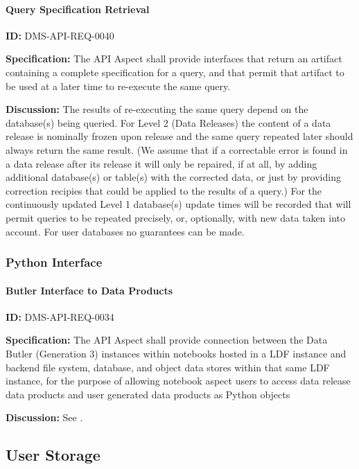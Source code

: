\documentclass[SE,toc]{lsstdoc}
\begin{document}
\paragraph{Query Specification Retrieval}\hfill  %

\label{DMS-API-REQ-0040}
\textbf{ID:} DMS-API-REQ-0040

\textbf{Specification:}
The API Aspect shall provide interfaces that return an artifact containing a complete specification for a query, and that permit that artifact to be used at a later time to re-execute the same query.

\textbf{Discussion:}
The results of re-executing the same query depend on the database(s) being queried.  For Level 2 (Data Releases) the content of a data release is nominally frozen upon release and the same query repeated later should always return the same result.  (We assume that if a correctable error is found in a data release after its release it will only be repaired, if at all, by adding additional database(s) or table(s) with the corrected data, or just by providing correction recipies that could be applied to the results of a query.)
For the continuously updated Level 1 database(s) update times will be recorded that will permit queries to be repeated precisely, or, optionally, with new data taken into account.
For user databases no guarantees can be made.

\subsubsection{Python Interface}

\paragraph{Butler Interface to Data Products}\hfill  %

\label{DMS-API-REQ-0034}
\textbf{ID:} DMS-API-REQ-0034

\textbf{Specification:}
The API Aspect shall provide connection between the Data Butler (Generation 3) instances within notebooks hosted in a LDF instance and backend file system, database, and object data stores within that same LDF instance, for the purpose of allowing notebook aspect users to access data release data products and user generated data products as Python objects

\textbf{Discussion:}
See .

\subsection{User Storage}
\end{document}
